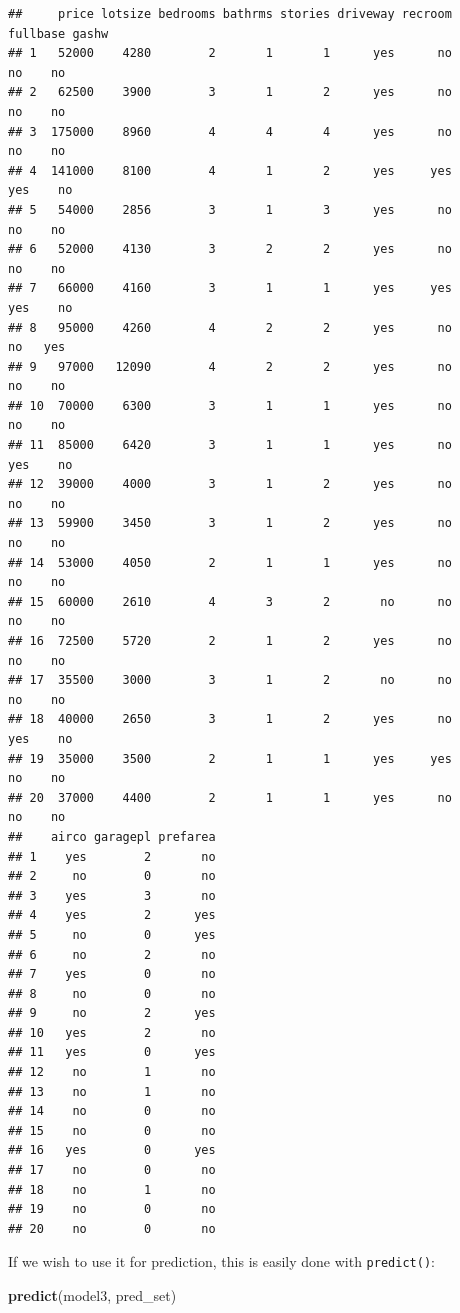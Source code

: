 \documentclass[]{gitbook}
\newenvironment{Shaded}{\begin{snugshade}}{\end{snugshade}}
\newcommand{\KeywordTok}[1]{\textcolor[rgb]{0.13,0.29,0.53}{\textbf{#1}}}
\newcommand{\NormalTok}[1]{#1}
\begin{document}
\begin{verbatim}
##     price lotsize bedrooms bathrms stories driveway recroom fullbase gashw
## 1   52000    4280        2       1       1      yes      no       no    no
## 2   62500    3900        3       1       2      yes      no       no    no
## 3  175000    8960        4       4       4      yes      no       no    no
## 4  141000    8100        4       1       2      yes     yes      yes    no
## 5   54000    2856        3       1       3      yes      no       no    no
## 6   52000    4130        3       2       2      yes      no       no    no
## 7   66000    4160        3       1       1      yes     yes      yes    no
## 8   95000    4260        4       2       2      yes      no       no   yes
## 9   97000   12090        4       2       2      yes      no       no    no
## 10  70000    6300        3       1       1      yes      no       no    no
## 11  85000    6420        3       1       1      yes      no      yes    no
## 12  39000    4000        3       1       2      yes      no       no    no
## 13  59900    3450        3       1       2      yes      no       no    no
## 14  53000    4050        2       1       1      yes      no       no    no
## 15  60000    2610        4       3       2       no      no       no    no
## 16  72500    5720        2       1       2      yes      no       no    no
## 17  35500    3000        3       1       2       no      no       no    no
## 18  40000    2650        3       1       2      yes      no      yes    no
## 19  35000    3500        2       1       1      yes     yes       no    no
## 20  37000    4400        2       1       1      yes      no       no    no
##    airco garagepl prefarea
## 1    yes        2       no
## 2     no        0       no
## 3    yes        3       no
## 4    yes        2      yes
## 5     no        0      yes
## 6     no        2       no
## 7    yes        0       no
## 8     no        0       no
## 9     no        2      yes
## 10   yes        2       no
## 11   yes        0      yes
## 12    no        1       no
## 13    no        1       no
## 14    no        0       no
## 15    no        0       no
## 16   yes        0      yes
## 17    no        0       no
## 18    no        1       no
## 19    no        0       no
## 20    no        0       no
\end{verbatim}

If we wish to use it for prediction, this is easily done with \texttt{predict()}:

\begin{Shaded}
\begin{Highlighting}[]
\KeywordTok{predict}\NormalTok{(model3, pred_set)}
\end{Highlighting}
\end{Shaded}
\end{document}
